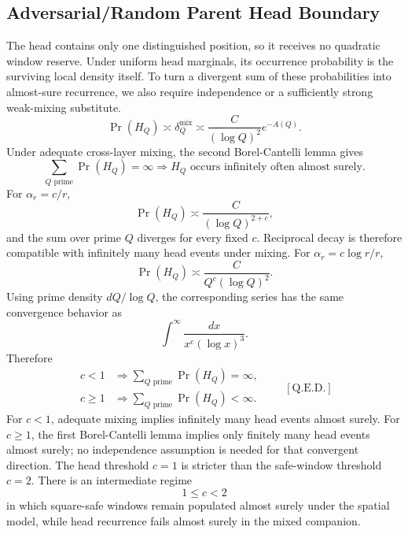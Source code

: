 \subsection{Adversarial/Random Parent Head Boundary}
The head contains only one distinguished position, so it receives no quadratic window reserve. Under uniform head marginals, its occurrence probability is the surviving local density itself. To turn a divergent sum of these probabilities into almost-sure recurrence, we also require independence or a sufficiently strong weak-mixing substitute.
\begin{equation*}
\Pr(H_Q)
\asymp
\delta_Q^{\mathrm{mix}}
\asymp
\frac{C}{(\log Q)^2}e^{-A(Q)}.
\end{equation*}
Under adequate cross-layer mixing, the second Borel-Cantelli lemma gives
\begin{equation*}
\sum_{Q\text{ prime}}\Pr(H_Q)=\infty
\Longrightarrow
H_Q\text{ occurs infinitely often almost surely}.
\end{equation*}
For $\alpha_r= c/r$,
\begin{equation*}
\Pr(H_Q)\asymp\frac{C}{(\log Q)^{2+c}},
\end{equation*}
and the sum over prime $Q$ diverges for every fixed $c$. Reciprocal decay is therefore compatible with infinitely many head events under mixing.
For $\alpha_r= c\log r/r$,
\begin{equation*}
\Pr(H_Q)\asymp\frac{C}{Q^c(\log Q)^2}.
\end{equation*}
Using prime density $dQ/\log Q$, the corresponding series has the same convergence behavior as
\begin{equation*}
\int^\infty\frac{dx}{x^c(\log x)^3}.
\end{equation*}
Therefore
\begin{equation*}
\begin{aligned}
c < 1
&\Longrightarrow
\sum_{Q\text{ prime}}\Pr(H_Q)=\infty,\\
c\ge 1
&\Longrightarrow
\sum_{Q\text{ prime}}\Pr(H_Q) < \infty.
\end{aligned}
\qquad[\text{Q.E.D.}]
\end{equation*}
For $c < 1$, adequate mixing implies infinitely many head events almost surely. For $c\ge 1$, the first Borel-Cantelli lemma implies only finitely many head events almost surely; no independence assumption is needed for that convergent direction.
The head threshold $c=1$ is stricter than the safe-window threshold $c=2$. There is an intermediate regime
\begin{equation*}
1\le c < 2
\end{equation*}
in which square-safe windows remain populated almost surely under the spatial model, while head recurrence fails almost surely in the mixed companion.
